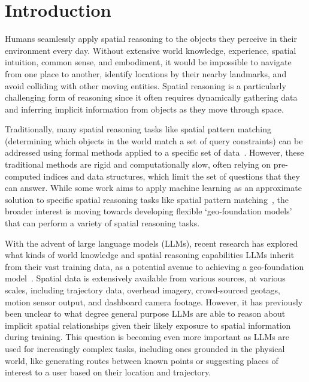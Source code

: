 \section{Introduction}
\label{section:introduction}

Humans seamlessly apply spatial reasoning to the objects they perceive in their environment every day.
Without extensive world knowledge, experience, spatial intuition, common sense, and embodiment, it would be impossible to navigate from one place to another, identify locations by their nearby landmarks, and avoid colliding with other moving entities.
Spatial reasoning is a particularly challenging form of reasoning since it often requires dynamically gathering data and inferring implicit information from objects as they move through space.


Traditionally, many spatial reasoning tasks like spatial pattern matching (determining which objects in the world match a set of query constraints) can be addressed using formal methods applied to a specific set of data~\cite{Papadias1998, Schwering2014, Duckham2023,Folkers2000, Chen2019, Fang2019, Minervino2023, Osul2023, Osul2023b}.
However, these traditional methods are rigid and computationally slow, often relying on pre-computed indices and data structures, which limit the set of questions that they can answer.
While some work aims to apply machine learning as an approximate solution to specific spatial reasoning tasks like spatial pattern matching~\cite{Schneider2024, Schneider2024b}, the broader interest is moving towards developing flexible `geo-foundation models' that can perform a variety of spatial reasoning tasks.


With the advent of large language models (LLMs), recent research has explored what kinds of world knowledge and spatial reasoning capabilities LLMs inherit from their vast training data, as a potential avenue to achieving a geo-foundation model~\cite{Mai2023, Bhandari2023, Qi2023}. 
Spatial data is extensively available from various sources, at various scales, including trajectory data, overhead imagery, crowd-sourced geotags, motion sensor output, and dashboard camera footage.
However, it has previously been unclear to what degree general purpose LLMs are able to reason about implicit spatial relationships given their likely exposure to spatial information during training.
This question is becoming even more important as LLMs are used for increasingly complex tasks, including ones grounded in the physical world, like generating routes between known points or suggesting places of interest to a user based on their location and trajectory.


